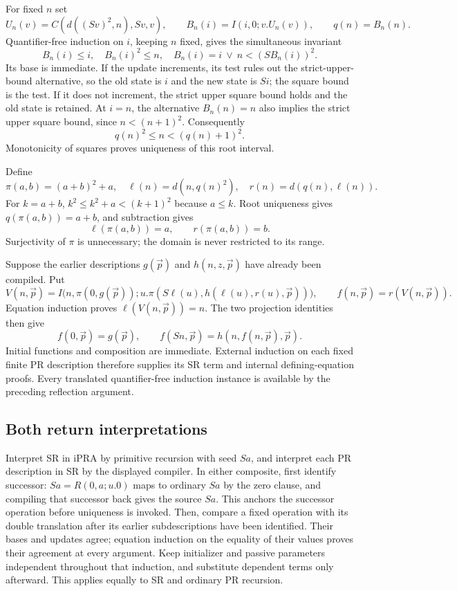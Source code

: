 For fixed $n$ set
\[
 U_n(v)=C(d((Sv)^2,n),Sv,v),\qquad
 B_n(i)=I(i,0;v.U_n(v)),\qquad q(n)=B_n(n).
\]
Quantifier-free induction on $i$, keeping $n$ fixed, gives the simultaneous
invariant
\[
 B_n(i)\le i,\quad B_n(i)^2\le n,\quad
                  B_n(i)=i\ \lor\ n<(S B_n(i))^2.
\]
Its base is immediate. If the update increments, its test rules out
the strict-upper-bound alternative, so the old state is $i$ and the new
state is $Si$; the square bound is the test. If it does not increment,
the strict upper square bound holds and the old state is retained.
At $i=n$, the alternative $B_n(n)=n$ also implies the strict upper
square bound, since $n<(n+1)^2$. Consequently
\[
                       q(n)^2\le n<(q(n)+1)^2.
\]
Monotonicity of squares proves uniqueness of this root interval.

Define
\[
 \pi(a,b)=(a+b)^2+a,\quad
 \ell(n)=d(n,q(n)^2),\quad r(n)=d(q(n),\ell(n)).
\]
For $k=a+b$, $k^2\le k^2+a<(k+1)^2$ because $a\le k$.
Root uniqueness gives $q(\pi(a,b))=a+b$, and subtraction gives
\[
                 \ell(\pi(a,b))=a,\qquad r(\pi(a,b))=b.
\]
Surjectivity of $\pi$ is unnecessary; the domain is never restricted to
its range.

Suppose the earlier descriptions $g(\vec p)$ and $h(n,z,\vec p)$ have
already been compiled. Put
\[
 V(n,\vec p)=I\bigl(n,\pi(0,g(\vec p));
       u.\pi(S\ell(u),h(\ell(u),r(u),\vec p))\bigr),\qquad
 f(n,\vec p)=r(V(n,\vec p)).
\]
Equation induction proves $\ell(V(n,\vec p))=n$. The two projection
identities then give
\[
 f(0,\vec p)=g(\vec p),\qquad
 f(Sn,\vec p)=h(n,f(n,\vec p),\vec p).
\]
Initial functions and composition are immediate. External induction on
each fixed finite PR description therefore supplies its SR term and
internal defining-equation proofs. Every translated quantifier-free
induction instance is available by the preceding reflection argument.

\subsection{Both return interpretations}

Interpret SR in iPRA by primitive recursion with seed $Sa$, and interpret
each PR description in SR by the displayed compiler. In either composite,
first identify successor: $Sa=R(0,a;u.0)$ maps to ordinary $Sa$ by the
zero clause, and compiling that successor back gives the source $Sa$.
This anchors the successor operation before uniqueness is invoked.
Then,
compare a fixed operation with its double translation after its earlier
subdescriptions have been identified. Their bases and updates agree;
equation induction on the equality of their values proves their agreement
at every argument. Keep initializer and passive parameters independent
throughout that induction, and substitute dependent terms only afterward.
This applies equally to SR and ordinary PR recursion.

